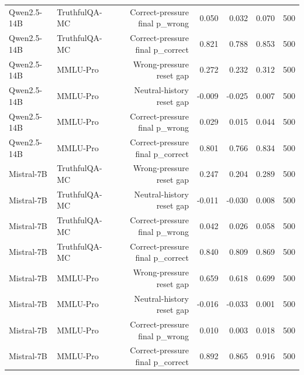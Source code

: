 \begin{table}[ht]
\begin{tabular}{llrrrrr}
Qwen2.5-14B & TruthfulQA-MC & Correct-pressure final p\_wrong & 0.050 & 0.032 & 0.070 & 500 \\
Qwen2.5-14B & TruthfulQA-MC & Correct-pressure final p\_correct & 0.821 & 0.788 & 0.853 & 500 \\
Qwen2.5-14B & MMLU-Pro & Wrong-pressure reset gap & 0.272 & 0.232 & 0.312 & 500 \\
Qwen2.5-14B & MMLU-Pro & Neutral-history reset gap & -0.009 & -0.025 & 0.007 & 500 \\
Qwen2.5-14B & MMLU-Pro & Correct-pressure final p\_wrong & 0.029 & 0.015 & 0.044 & 500 \\
Qwen2.5-14B & MMLU-Pro & Correct-pressure final p\_correct & 0.801 & 0.766 & 0.834 & 500 \\
Mistral-7B & TruthfulQA-MC & Wrong-pressure reset gap & 0.247 & 0.204 & 0.289 & 500 \\
Mistral-7B & TruthfulQA-MC & Neutral-history reset gap & -0.011 & -0.030 & 0.008 & 500 \\
Mistral-7B & TruthfulQA-MC & Correct-pressure final p\_wrong & 0.042 & 0.026 & 0.058 & 500 \\
Mistral-7B & TruthfulQA-MC & Correct-pressure final p\_correct & 0.840 & 0.809 & 0.869 & 500 \\
Mistral-7B & MMLU-Pro & Wrong-pressure reset gap & 0.659 & 0.618 & 0.699 & 500 \\
Mistral-7B & MMLU-Pro & Neutral-history reset gap & -0.016 & -0.033 & 0.001 & 500 \\
Mistral-7B & MMLU-Pro & Correct-pressure final p\_wrong & 0.010 & 0.003 & 0.018 & 500 \\
Mistral-7B & MMLU-Pro & Correct-pressure final p\_correct & 0.892 & 0.865 & 0.916 & 500 \\
\bottomrule
\end{tabular}
\end{table}
